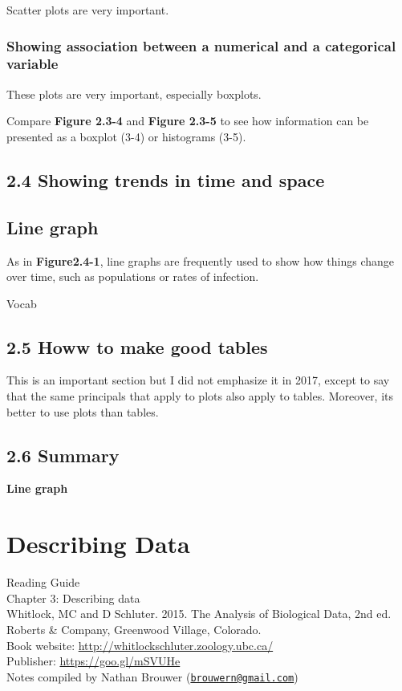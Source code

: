 \documentclass[]{book}
\theoremstyle{definition}
\theoremstyle{definition}
\theoremstyle{definition}
\theoremstyle{remark}
\begin{document}
Scatter plots are very important.

\subsection{Showing association between a numerical and a categorical
variable}\label{showing-association-between-a-numerical-and-a-categorical-variable}

These plots are very important, especially boxplots.

Compare \textbf{Figure 2.3-4} and \textbf{Figure 2.3-5} to see how
information can be presented as a boxplot (3-4) or histograms (3-5).

\section{2.4 Showing trends in time and
space}\label{showing-trends-in-time-and-space}

\section{Line graph}\label{line-graph}

As in \textbf{Figure2.4-1}, line graphs are frequently used to show how
things change over time, such as populations or rates of infection.

Vocab

\section{2.5 Howw to make good tables}\label{howw-to-make-good-tables}

This is an important section but I did not emphasize it in 2017, except
to say that the same principals that apply to plots also apply to
tables. Moreover, its better to use plots than tables.

\section{2.6 Summary}\label{summary-1}

\textbf{Line graph}

\chapter{Describing Data}\label{describing-data}

Reading Guide\\
Chapter 3: Describing data\\
Whitlock, MC and D Schluter. 2015. The Analysis of Biological Data, 2nd
ed. Roberts \& Company, Greenwood Village, Colorado.\\
Book website: \url{http://whitlockschluter.zoology.ubc.ca/}\\
Publisher: \url{https://goo.gl/mSVUHe}\\
Notes compiled by Nathan Brouwer
(\href{mailto:brouwern@gmail.com}{\nolinkurl{brouwern@gmail.com}})
\end{document}

